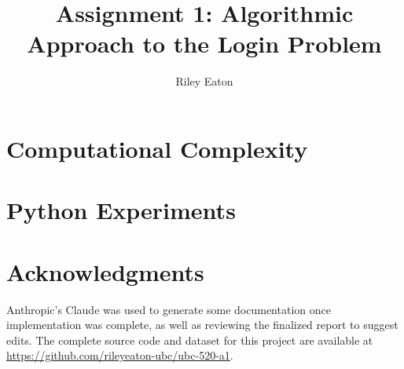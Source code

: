 \documentclass[acmsmall,screen]{acmart}
\title{Assignment 1: Algorithmic Approach to the Login Problem}
\author{Riley Eaton}
\affiliation{%
  \institution{University of British Columbia}
  \city{Kelowna}
  \state{BC}
  \country{Canada}
}
\begin{document}
\fancyfoot{} %

\maketitle

\section{Computational Complexity} \label{sec:complexity}


\section{Python Experiments} \label{sec:experiments}







\section*{Acknowledgments}
Anthropic's Claude was used to generate some documentation once implementation was complete, as well as reviewing the finalized report to suggest edits. The complete source code and dataset for this project are available at \url{https://github.com/rileyeaton-ubc/ubc-520-a1}.
\end{document}
